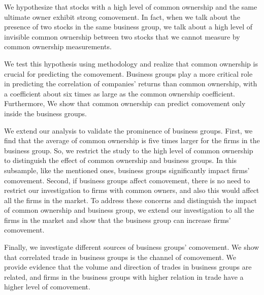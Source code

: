 We hypothesize that stocks with a high level of common ownership and the same ultimate owner exhibit strong comovement. In fact, when we talk about the presence of two stocks in the same business group, we talk about a high level of invisible common ownership between two stocks that we cannot measure by common ownership measurements. 

We test this hypothesis using \cite{AntonPolk} methodology and realize that common ownership is crucial for predicting the comovement. Business groups play a more critical role in predicting the correlation of companies' returns than common ownership, with a coefficient about six times as large as the common ownership coefficient. Furthermore, We show that common ownership can predict comovement only inside the business groups.



We extend our analysis to validate the prominence of business groups. First, we find that the average of common ownership is five times larger for the firms in the business group. So, we restrict the study to the high level of common ownership to distinguish the effect of common ownership and business groups. In this subsample, like the mentioned ones, business groups significantly impact firms' comovement. Second, if business groups affect comovement, there is no need to restrict our investigation to firms with common owners, and also this would affect all the firms in the market. To address these concerns and distinguish the impact of common ownership and business group, we extend our investigation to all the firms in the market and show that the business group can increase firms' comovement. 
	
{Finally, we investigate different sources of business groups' comovement. We show that correlated trade in business groups is the channel of comovement. We provide evidence that the volume and direction of trades in business groups are related, and firms in the business groups with higher relation in trade have a higher level of comovement.}
	
	

%